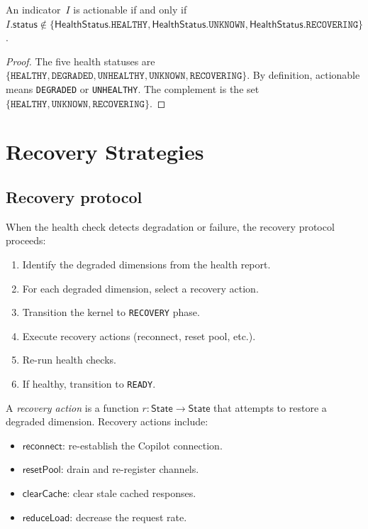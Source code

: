 \documentclass[11pt]{article}
\newcommand{\HealthStat}{\mathsf{HealthStatus}}
\begin{document}
\begin{lemma}\label{lem:actclass}
An indicator~$I$ is actionable if and only if
$I.\mathsf{status} \not\in \{\HealthStat.\texttt{HEALTHY},
\HealthStat.\texttt{UNKNOWN},
\HealthStat.\texttt{RECOVERING}\}$.
\end{lemma}
\begin{proof}
The five health statuses are
$\{\texttt{HEALTHY}, \texttt{DEGRADED}, \texttt{UNHEALTHY},
\texttt{UNKNOWN}, \texttt{RECOVERING}\}$.
By definition, actionable means \texttt{DEGRADED} or
\texttt{UNHEALTHY}.  The complement is the set
$\{\texttt{HEALTHY}, \texttt{UNKNOWN}, \texttt{RECOVERING}\}$.
\end{proof}

\section{Recovery Strategies}\label{sec:recovery}

\subsection{Recovery protocol}

When the health check detects degradation or failure,
the recovery protocol proceeds:
\begin{enumerate}
\item Identify the degraded dimensions from the health report.
\item For each degraded dimension, select a recovery action.
\item Transition the kernel to \texttt{RECOVERY} phase.
\item Execute recovery actions (reconnect, reset pool, etc.).
\item Re-run health checks.
\item If healthy, transition to \texttt{READY}.
\end{enumerate}

\begin{definition}\label{def:recovaction}
A \emph{recovery action} is a function
$r \colon \mathsf{State} \to \mathsf{State}$
that attempts to restore a degraded dimension.
Recovery actions include:
\begin{itemize}
\item $\mathsf{reconnect}$: re-establish the Copilot connection.
\item $\mathsf{resetPool}$: drain and re-register channels.
\item $\mathsf{clearCache}$: clear stale cached responses.
\item $\mathsf{reduceLoad}$: decrease the request rate.
\end{itemize}
\end{definition}
\end{document}
